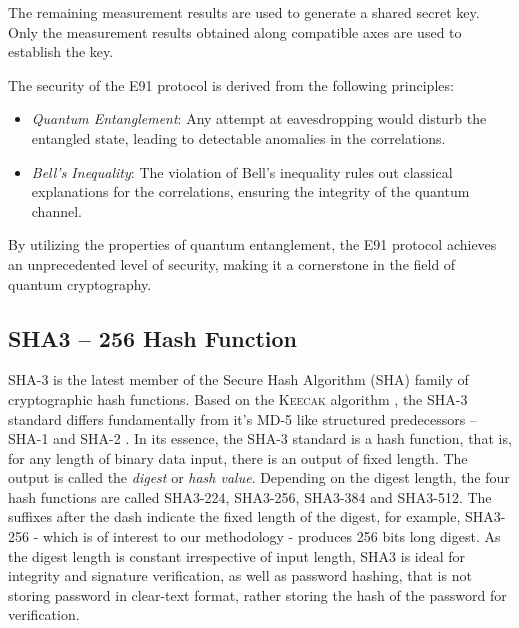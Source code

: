 \documentclass{article}
\begin{document}
The remaining measurement results are used to generate a shared secret key. Only the measurement results obtained along compatible axes are used to establish the key.

The security of the E91 protocol is derived from the following principles:
\begin{itemize}
    \item \textit{Quantum Entanglement}: Any attempt at eavesdropping would disturb the entangled state, leading to detectable anomalies in the correlations.
    \item \textit{Bell's Inequality}: The violation of Bell's inequality rules out classical explanations for the correlations, ensuring the integrity of the quantum channel.
\end{itemize}

By utilizing the properties of quantum entanglement, the E91 protocol achieves an unprecedented level of security, making it a cornerstone in the field of quantum cryptography.
\subsection{SHA3 -- 256 Hash Function}
\label{sec:sha3}
SHA-3 is the latest member \cite{nistHashFunctions} of the Secure Hash Algorithm (SHA) family of cryptographic hash functions. Based on the K\textsc{eecak} algorithm \cite{Bbbbbbb2011}, the SHA-3 standard differs fundamentally from it's MD-5 \cite{rivest1992md5} like structured predecessors -- SHA-1 and SHA-2 \cite{penard2008secure}. In its essence, the SHA-3 standard is a hash function, that is, for any length of binary data input, there is an output of fixed length. The output is called the \textit{digest} or \textit{hash value}. Depending on the digest length, the four hash functions are called SHA3-224, SHA3-256, SHA3-384 and SHA3-512. The suffixes after the dash indicate the fixed length of the digest, for example, SHA3-256 - which is of interest to our methodology - produces 256 bits long digest. As the digest length is constant irrespective of input length, SHA3 is ideal for integrity and signature verification, as well as password hashing, that is not storing password in clear-text format, rather storing the hash of the password for verification.
\end{document}
